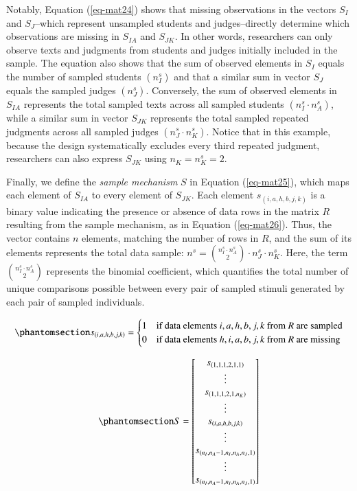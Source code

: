 \documentclass[
  authoryear,
  review,
  1p]{elsarticle}
\begin{document}
Notably, Equation (\ref{eq-mat24}) shows that missing observations in
the vectors \(S_{I}\) and \(S_{J}\)--which represent unsampled students
and judges--directly determine which observations are missing in
\(S_{IA}\) and \(S_{JK}\). In other words, researchers can only observe
texts and judgments from students and judges initially included in the
sample. The equation also shows that the sum of observed elements in
\(S_{I}\) equals the number of sampled students \((n^{s}_{I})\) and that
a similar sum in vector \(S_{J}\) equals the sampled judges
\((n^{s}_{J})\). Conversely, the sum of observed elements in \(S_{IA}\)
represents the total sampled texts across all sampled students
\((n^{s}_{I} \cdot n^{s}_{A})\), while a similar sum in vector
\(S_{JK}\) represents the total sampled repeated judgments across all
sampled judges \((n^{s}_{J} \cdot n^{s}_{K})\). Notice that in this
example, because the design systematically excludes every third repeated
judgment, researchers can also express \(S_{JK}\) using
\(n_{K} = n^{s}_{K} = 2\).

Finally, we define the \emph{sample mechanism} \(S\) in Equation
(\ref{eq-mat25}), which maps each element of \(S_{IA}\) to every element
of \(S_{JK}\). Each element \(s_{(i,a,h,b,j,k)}\) is a binary value
indicating the presence or absence of data rows in the matrix \(R\)
resulting from the sample mechanism, as in Equation (\ref{eq-mat26}).
Thus, the vector contains \(n\) elements, matching the number of rows in
\(R\), and the sum of its elements represents the total data sample:
\(n^{s} = \binom{n^{s}_{I} \cdot n^{s}_{A}}{2} \cdot n^{s}_{J} \cdot n^{s}_{K}\).
Here, the term \({n^{s}_{I} \cdot n^{s}_{A} \choose 2}\) represents the
binomial coefficient, which quantifies the total number of unique
comparisons possible between every pair of sampled stimuli generated by
each pair of sampled individuals.

\begin{equation}\phantomsection\label{eq-mat26}{
s_{(i,a,h,b,j,k)} = \begin{cases} 
1 & \text{if data elements } i,a,h,b,j,k \text{ from } R \text{ are sampled} \\
0 & \text{if data elements } h,i,a,b,j,k \text{ from } R \text{ are missing}
\end{cases}
}\end{equation}

\begin{equation}\phantomsection\label{eq-mat25}{
S = \begin{bmatrix}
s_{(1,1,1,2,1,1)} \\
\vdots \\
s_{(1,1,1,2,1,n_{K})} \\
\vdots \\
s_{(i,a,h,b,j,k)} \\
\vdots \\
s_{(n_{I},n_{A}-1,n_{I},n_{A},n_{J},1)} \\
\vdots \\
s_{(n_{I},n_{A}-1,n_{I},n_{A},n_{J},1)}
\end{bmatrix}
}\end{equation}
\end{document}
